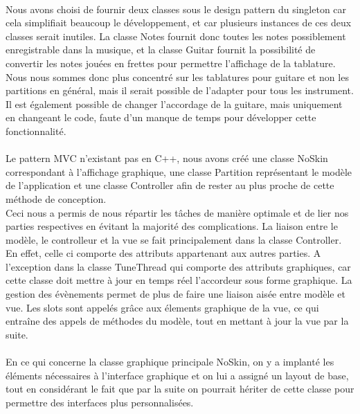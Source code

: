 \paragraph{}
Nous avons choisi de fournir deux classes sous le design pattern du singleton car cela simplifiait beaucoup le développement, et 
car plusieurs instances de ces deux classes serait inutiles. La classe Notes fournit donc toutes les notes possiblement enregistrable 
dans la musique, et la classe Guitar fournit la possibilité de convertir les notes jouées en frettes pour permettre l'affichage de la 
tablature. Nous nous sommes donc plus concentré sur les tablatures pour guitare et non les partitions en général, 
mais il serait possible de l'adapter pour tous les instrument. Il est également possible de changer l'accordage de la guitare, mais 
uniquement en changeant le code, faute d'un manque de temps pour développer cette fonctionnalité.

\paragraph{}
Le pattern MVC n'existant pas en C++, nous avons créé une classe NoSkin correspondant à l'affichage graphique, une classe Partition représentant le modèle de l'application et une classe Controller afin de rester au plus proche de cette méthode de conception. \\
Ceci nous a permis de nous répartir les tâches de manière optimale et de lier nos parties respectives en évitant la majorité des complications. La liaison 
entre le modèle, le controlleur et la vue se fait principalement dans la classe Controller. En effet, celle ci comporte des attributs appartenant aux autres 
parties. A l'exception dans la classe TuneThread qui comporte des attributs graphiques, car cette classe doit mettre à jour en temps réel l'accordeur 
sous forme graphique. La gestion des évènements permet de plus de faire une liaison aisée entre modèle et vue. Les slots sont appelés grâce aux 
élements graphique de la vue, ce qui entraîne des appels de méthodes du modèle, tout en mettant à jour la vue par la suite. 

\paragraph{}
En ce qui concerne la classe graphique principale NoSkin, on y a implanté les éléments nécessaires à l'interface graphique et on lui a assigné un layout de base, tout en considérant le fait que par la suite on pourrait hériter de cette classe pour permettre des interfaces plus personnalisées.

